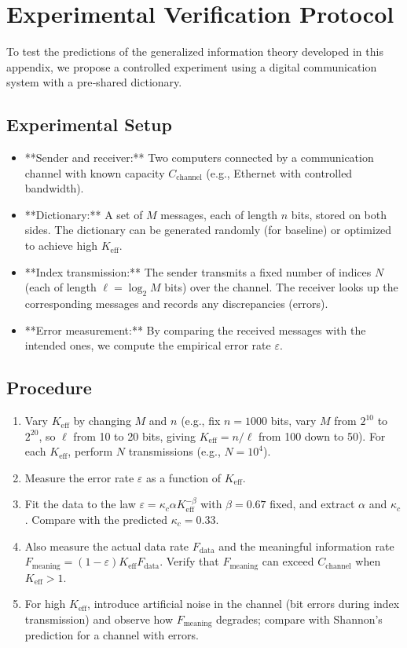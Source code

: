 \documentclass[12pt,a4paper]{article}
\theoremstyle{remark}
\newcommand{\Keff}{K_{\mathrm{eff}}}
\begin{document}
	\section{Experimental Verification Protocol}
	\label{sec:experiment}
	
	To test the predictions of the generalized information theory developed in this appendix, we propose a controlled experiment using a digital communication system with a pre‑shared dictionary.
	
	\subsection{Experimental Setup}
	
	\begin{itemize}
		\item **Sender and receiver:** Two computers connected by a communication channel with known capacity $C_{\text{channel}}$ (e.g., Ethernet with controlled bandwidth).
		\item **Dictionary:** A set of $M$ messages, each of length $n$ bits, stored on both sides. The dictionary can be generated randomly (for baseline) or optimized to achieve high $\Keff$.
		\item **Index transmission:** The sender transmits a fixed number of indices $N$ (each of length $\ell = \log_2 M$ bits) over the channel. The receiver looks up the corresponding messages and records any discrepancies (errors).
		\item **Error measurement:** By comparing the received messages with the intended ones, we compute the empirical error rate $\varepsilon$.
	\end{itemize}
	
	\subsection{Procedure}
	
	\begin{enumerate}
		\item Vary $\Keff$ by changing $M$ and $n$ (e.g., fix $n=1000$ bits, vary $M$ from $2^{10}$ to $2^{20}$, so $\ell$ from 10 to 20 bits, giving $\Keff = n/\ell$ from 100 down to 50). For each $\Keff$, perform $N$ transmissions (e.g., $N=10^4$).
		\item Measure the error rate $\varepsilon$ as a function of $\Keff$.
		\item Fit the data to the law $\varepsilon = \kappa_c \alpha \Keff^{-\beta}$ with $\beta=0.67$ fixed, and extract $\alpha$ and $\kappa_c$. Compare with the predicted $\kappa_c=0.33$.
		\item Also measure the actual data rate $F_{\text{data}}$ and the meaningful information rate $F_{\text{meaning}} = (1-\varepsilon) \Keff F_{\text{data}}$. Verify that $F_{\text{meaning}}$ can exceed $C_{\text{channel}}$ when $\Keff>1$.
		\item For high $\Keff$, introduce artificial noise in the channel (bit errors during index transmission) and observe how $F_{\text{meaning}}$ degrades; compare with Shannon's prediction for a channel with errors.
	\end{enumerate}
	
\end{document}
